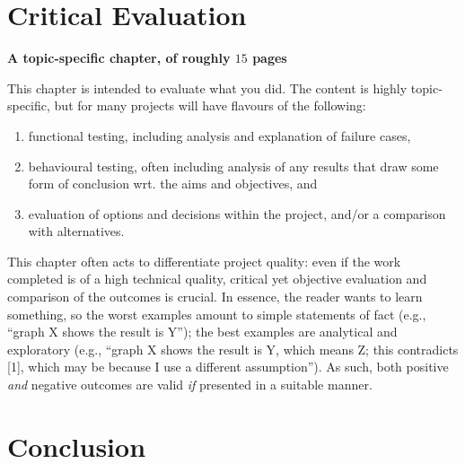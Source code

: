 \documentclass[ draft,
                    author={Alexander Hill},
                supervisor={Dr. Benjamin Sach},
                    degree={MEng},
                     title={MARMOSET: Multi Agent Real-time Multi-core Online
                     Simulation for Efficient Transportation},
                  subtitle={},
                      type={research},
                      year={2016} ]{dissertation}
\begin{document}


\chapter{Critical Evaluation}
\label{chap:evaluation}

{\bf A topic-specific chapter, of roughly $15$ pages}
\vspace{1cm}

\noindent
This chapter is intended to evaluate what you did.  The content is highly
topic-specific, but for many projects will have flavours of the following:

\begin{enumerate}
\item functional  testing, including analysis and explanation of failure
      cases,
\item behavioural testing, often including analysis of any results that
      draw some form of conclusion wrt. the aims and objectives,
      and
\item evaluation of options and decisions within the project, and/or a
      comparison with alternatives.
\end{enumerate}

\noindent
This chapter often acts to differentiate project quality: even if the work
completed is of a high technical quality, critical yet objective evaluation
and comparison of the outcomes is crucial.  In essence, the reader wants to
learn something, so the worst examples amount to simple statements of fact
(e.g., ``graph X shows the result is Y''); the best examples are analytical
and exploratory (e.g., ``graph X shows the result is Y, which means Z; this
contradicts [1], which may be because I use a different assumption'').  As
such, both positive {\em and} negative outcomes are valid {\em if} presented
in a suitable manner.


\chapter{Conclusion}
\label{chap:conclusion}
\end{document}
